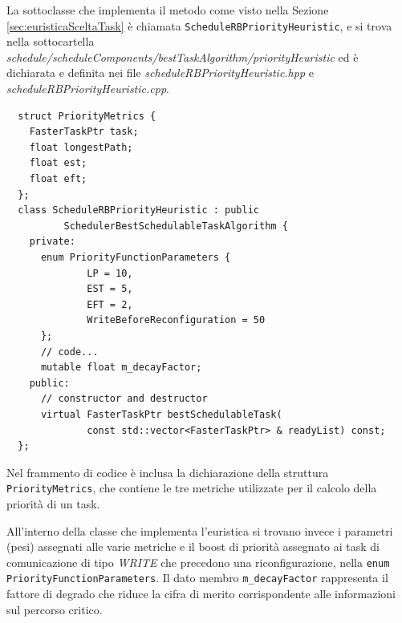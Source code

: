La sottoclasse che implementa il metodo come visto nella Sezione 
\ref{sec:euristicaSceltaTask} è chiamata \verb+ScheduleRBPriorityHeuristic+, e 
si trova nella sottocartella 
\emph{schedule/scheduleComponents/bestTaskAlgorithm/priorityHeuristic} ed è 
dichiarata e definita nei file \emph{scheduleRBPriorityHeuristic.hpp} e 
\emph{scheduleRBPriorityHeuristic.cpp}.
\newline
\begin{verbatim}
  struct PriorityMetrics {
    FasterTaskPtr task;
    float longestPath;
    float est;
    float eft;
  };
  class ScheduleRBPriorityHeuristic : public 
          SchedulerBestSchedulableTaskAlgorithm {
    private:
      enum PriorityFunctionParameters {
              LP = 10,
              EST = 5,
              EFT = 2,
              WriteBeforeReconfiguration = 50
      };
      // code...
      mutable float m_decayFactor;
    public:
      // constructor and destructor
      virtual FasterTaskPtr bestSchedulableTask(
              const std::vector<FasterTaskPtr> & readyList) const;
  };
\end{verbatim}

Nel frammento di codice è inclusa la dichiarazione della 
struttura \verb+PriorityMetrics+, che contiene le tre metriche utilizzate per 
il calcolo della priorità di un task.

All'interno della classe che implementa l'euristica si trovano invece i 
parametri (pesi) assegnati alle varie metriche e il boost di priorità assegnato 
ai task di comunicazione di tipo \emph{WRITE} che precedono una 
riconfigurazione, nella \verb+enum PriorityFunctionParameters+. Il dato membro 
\verb+m_decayFactor+ rappresenta il fattore di degrado che riduce la cifra di 
merito corrispondente alle informazioni sul percorso critico.


